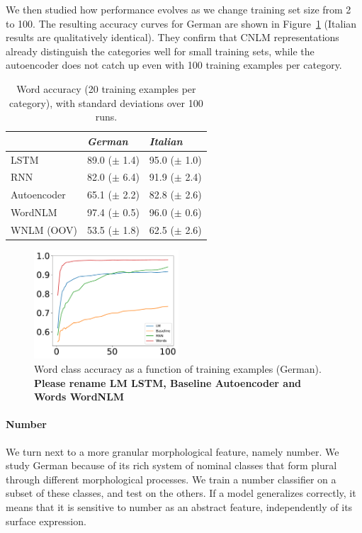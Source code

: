 We then studied how performance evolves as we change training set size from 2 to 100. The resulting accuracy curves for German are shown in Figure~\ref{fig:pos-induction} (Italian results are qualitatively identical). They confirm that CNLM representations already distinguish the categories well for small training sets, while the autoencoder does not catch up even with 100 training examples per category.

\begin{table}[t]
  \begin{center}
    \begin{tabular}{l|l|l}
   &\emph{German}&\emph{Italian}\\
      \hline
	    LSTM & 89.0 ($\pm$ 1.4) & 95.0 ($\pm$ 1.0) \\
	    RNN & 82.0 ($\pm$ 6.4) & 91.9 ($\pm$ 2.4) \\
	    Autoencoder & 65.1 ($\pm$ 2.2) & 82.8 ($\pm$ 2.6) \\
	    WordNLM & 97.4 ($\pm$ 0.5) & 96.0 ($\pm$ 0.6) \\
	    WNLM (OOV) & 53.5 ($\pm$ 1.8)  & 62.5 ($\pm$ 2.6) \\
    \end{tabular}
  \end{center}
  \caption{\label{tab:pos-results} Word  accuracy (20 training examples per category), with standard deviations over 100 runs.}
\end{table}


\begin{figure}
\includegraphics[width=0.48\textwidth]{figures/german_pos_nouns_verbs.pdf}
	\caption{Word class accuracy as a function of training examples (German). \textbf{Please rename LM LSTM, Baseline Autoencoder and Words WordNLM}}\label{fig:pos-induction}
\end{figure}





\paragraph{Number}
We turn next to a more granular morphological feature, namely
number. We study German because of its rich system of nominal classes
that form plural through different morphological processes. We train a
number classifier on a subset of these classes, and test on the
others. If a model generalizes correctly, it means that it is
sensitive to number as an abstract feature, independently of its
surface expression.

